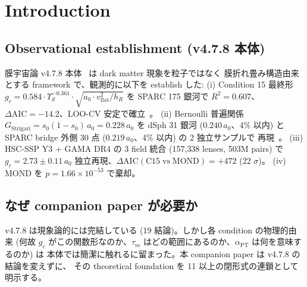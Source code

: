 \documentclass[11pt,a4paper]{ltjsarticle}
\newcommand{\Tm}{T_{m}}
\newcommand{\aPT}{\alpha_{\mathrm{PT}}}
\newcommand{\taum}{\tau_{m}}
\newcommand{\taur}{\tau_{\mathrm{relax}}}
\newcommand{\Gammaact}{\Gamma_{\mathrm{actual}}}
\newcommand{\gc}{g_{c}}
\newcommand{\vflat}{v_{\mathrm{flat}}}
\newcommand{\hR}{h_{R}}
\newcommand{\Yd}{\Upsilon_{d}}
\newcommand{\AIC}{\Delta\mathrm{AIC}}
\begin{document}
\begin{abstract}
\smallskip\noindent
限界: (i) 無次元 $\Tm = \sqrt{6}$ の SI 絶対較正は foundation 内部では決定不能で、
$\sigma$ rest energy 候補と membrane coherence 候補の間に 96 桁 gap が残る。
(ii) membrane memory rate $\Gammaact$ の絶対値決定は 3 route (normal mode / FDT / 観測 proxy) の
並行評価に留まり、$\taur$ 物理選択を要する energy branching 問題に帰着する。
これら限界は v4.8 次版 (21cm + CMB TT cross-check) で対処予定。

\smallskip\noindent\textbf{Keywords:} membrane cosmology, dark matter alternative, MOND rejection,
FIRAS $\mu$-distortion, universal density coupling, C15
\end{abstract}

\clearpage

\section{Introduction}

\subsection{Observational establishment (v4.7.8 本体)}
膜宇宙論 v4.7.8 本体~\citep{Sakaguchi2026a} は dark matter 現象を粒子ではなく
膜折れ畳み構造由来とする framework で、観測的に以下を establish した:
(i) Condition 15 最終形 $\gc = 0.584 \cdot \Yd^{-0.361} \cdot \sqrt{a_0 \cdot \vflat^2 / \hR}$ を
SPARC 175 銀河で $R^2 = 0.607$、$\AIC = -14.2$、LOO-CV 安定で確立~\citep{Lelli2016c}。
(ii) Bernoulli 普遍関係 $G_{\mathrm{Strigari}} = s_0 (1 - s_0)\,a_0 = 0.228\,a_0$ を dSph 31 銀河
($0.240\,a_0$、4\% 以内) と SPARC bridge 外側 30 点 ($0.219\,a_0$、4\% 以内) の 2 独立サンプルで
再現~\citep{McConnachie2012, Strigari2008}。
(iii) HSC-SSP Y3 + GAMA DR4 の 3 field 統合 (157{,}338 lenses, 503M pairs) で
$\gc = 2.73 \pm 0.11\,a_0$ 独立再現、$\AIC(\mathrm{C15\;vs\;MOND}) = +472$ (22 $\sigma$)。
(iv) MOND を $p = 1.66 \times 10^{-53}$ で棄却。

\subsection{なぜ companion paper が必要か}
v4.7.8 は現象論的には完結している (19 結論)。しかし各 condition の物理的由来
(何故 $\gc$ がこの関数形なのか、$\taum$ はどの範囲にあるのか、$\aPT$ は何を意味するのか) は
本体では簡潔に触れるに留まった。本 companion paper は v4.7.8 の結論を変えずに、
その theoretical foundation を 11 以上の閉形式の連鎖として明示する。
\end{document}
